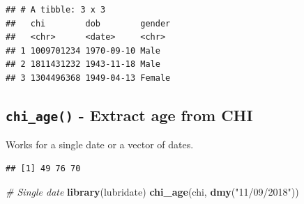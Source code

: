 \documentclass[]{book}
\newenvironment{Shaded}{\begin{snugshade}}{\end{snugshade}}
\newcommand{\CommentTok}[1]{\textcolor[rgb]{0.56,0.35,0.01}{\textit{#1}}}
\newcommand{\ControlFlowTok}[1]{\textcolor[rgb]{0.13,0.29,0.53}{\textbf{#1}}}
\newcommand{\DataTypeTok}[1]{\textcolor[rgb]{0.13,0.29,0.53}{#1}}
\newcommand{\DecValTok}[1]{\textcolor[rgb]{0.00,0.00,0.81}{#1}}
\newcommand{\KeywordTok}[1]{\textcolor[rgb]{0.13,0.29,0.53}{\textbf{#1}}}
\newcommand{\NormalTok}[1]{#1}
\newcommand{\OperatorTok}[1]{\textcolor[rgb]{0.81,0.36,0.00}{\textbf{#1}}}
\newcommand{\StringTok}[1]{\textcolor[rgb]{0.31,0.60,0.02}{#1}}
\begin{document}
\begin{Shaded}
\end{Shaded}

\begin{verbatim}
## # A tibble: 3 x 3
##   chi        dob        gender
##   <chr>      <date>     <chr> 
## 1 1009701234 1970-09-10 Male  
## 2 1811431232 1943-11-18 Male  
## 3 1304496368 1949-04-13 Female
\end{verbatim}

\hypertarget{chi_age---extract-age-from-chi}{%
\subsection{\texorpdfstring{\texttt{chi\_age()} - Extract age from CHI}{chi\_age() - Extract age from CHI}}\label{chi_age---extract-age-from-chi}}

Works for a single date or a vector of dates.

\begin{Shaded}
\end{Shaded}

\begin{verbatim}
## [1] 49 76 70
\end{verbatim}

\begin{Shaded}
\begin{Highlighting}[]
\CommentTok{# Single date}
\KeywordTok{library}\NormalTok{(lubridate)}
\KeywordTok{chi_age}\NormalTok{(chi, }\KeywordTok{dmy}\NormalTok{(}\StringTok{"11/09/2018"}\NormalTok{))}
\end{Highlighting}
\end{Shaded}
\end{document}
